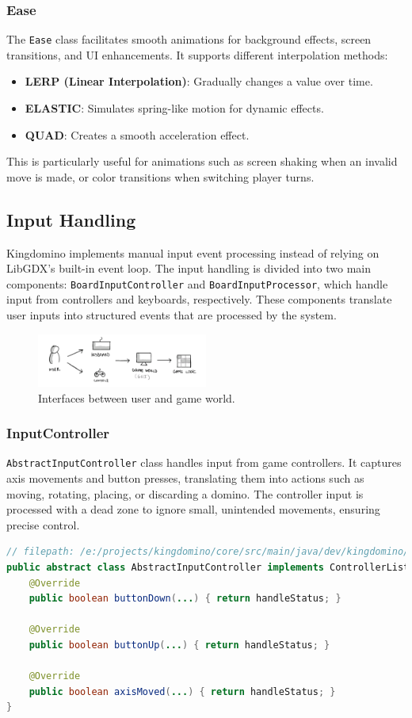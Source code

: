 \documentclass[conference]{IEEEtran}
\begin{document}
\subsubsection{Ease}
The \texttt{Ease} class facilitates smooth animations for background effects,
screen transitions, and UI enhancements. It supports different interpolation\cite{wiki:interpolation}
methods:
\begin{itemize}
    \item \textbf{LERP (Linear Interpolation)}: Gradually changes a value over time.
    \item \textbf{ELASTIC}: Simulates spring-like motion for dynamic effects.
    \item \textbf{QUAD}: Creates a smooth acceleration effect.
\end{itemize}
This is particularly useful for animations such as screen shaking when an invalid move is made, or color transitions when switching player turns.

\subsection{Input Handling}
Kingdomino implements manual input event processing instead of relying on
LibGDX's built-in event loop. The input handling is divided into two main
components: \texttt{BoardInputController} and \texttt{BoardInputProcessor},
which handle input from controllers and keyboards, respectively. These
components translate user inputs into structured events that are processed by
the system.

\begin{figure}[htbp]
    \centerline{\includegraphics[width=0.5\textwidth]{assets/interaction.png}}
    \caption{Interfaces between user and game world.}\label{fig:interaction}
\end{figure}

\subsubsection{InputController}
\texttt{AbstractInputController} class handles input from game controllers.
It captures axis movements and button presses, translating them into actions
such as moving, rotating, placing, or discarding a domino. The controller input
is processed with a dead zone to ignore small, unintended movements, ensuring
precise control.
\begin{lstlisting}[language=Java]
// filepath: /e:/projects/kingdomino/core/src/main/java/dev/kingdomino/game/AbstractInputController.java
public abstract class AbstractInputController implements ControllerListener {
    @Override
    public boolean buttonDown(...) { return handleStatus; }

    @Override
    public boolean buttonUp(...) { return handleStatus; }

    @Override
    public boolean axisMoved(...) { return handleStatus; }
}
\end{lstlisting}
\end{document}
